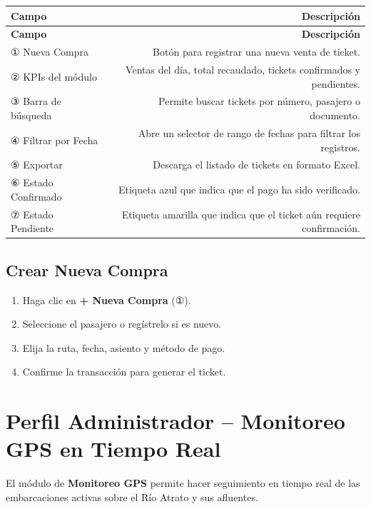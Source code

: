\documentclass[12pt,a4paper]{article}
\begin{document}
\begin{longtable}{LR}
  \toprule
  \textbf{Campo} & \textbf{Descripción} \\
  \midrule
  \endfirsthead
  \toprule
  \textbf{Campo} & \textbf{Descripción} \\
  \midrule
  \endhead
  \bottomrule
  \endfoot
  ① Nueva Compra         & Botón para registrar una nueva venta de ticket. \\[4pt]
  ② KPIs del módulo      & Ventas del día, total recaudado, tickets confirmados y pendientes. \\[4pt]
  ③ Barra de búsqueda    & Permite buscar tickets por número, pasajero o documento. \\[4pt]
  ④ Filtrar por Fecha    & Abre un selector de rango de fechas para filtrar los registros. \\[4pt]
  ⑤ Exportar            & Descarga el listado de tickets en formato Excel. \\[4pt]
  ⑥ Estado Confirmado   & Etiqueta azul que indica que el pago ha sido verificado. \\[4pt]
  ⑦ Estado Pendiente    & Etiqueta amarilla que indica que el ticket aún requiere confirmación. \\
\end{longtable}

\subsection{Crear Nueva Compra}

\begin{enumerate}[leftmargin=1.5em]
  \item Haga clic en \textbf{+ Nueva Compra} (①).
  \item Seleccione el pasajero o regístrelo si es nuevo.
  \item Elija la ruta, fecha, asiento y método de pago.
  \item Confirme la transacción para generar el ticket.
\end{enumerate}

\section{Perfil Administrador -- Monitoreo GPS en Tiempo Real}

El módulo de \textbf{Monitoreo GPS} permite hacer seguimiento en tiempo real de las embarcaciones activas sobre el Río Atrato y sus afluentes.
\end{document}
